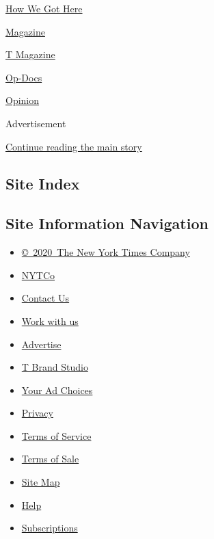 \href{/video/how-we-got-here}{How We Got Here}

\href{/video/magazine}{Magazine}

\href{/video/t-magazine}{T Magazine}

\href{/video/op-docs}{Op-Docs}

\href{/video/opinion}{Opinion}

Advertisement

\protect\hyperlink{after-bottom}{Continue reading the main story}

\hypertarget{site-index}{%
\subsection{Site Index}\label{site-index}}

\hypertarget{site-information-navigation}{%
\subsection{Site Information
Navigation}\label{site-information-navigation}}

\begin{itemize}
\tightlist
\item
  \href{https://help.nytimes3xbfgragh.onion/hc/en-us/articles/115014792127-Copyright-notice}{©~2020~The
  New York Times Company}
\end{itemize}

\begin{itemize}
\tightlist
\item
  \href{https://www.nytco.com/}{NYTCo}
\item
  \href{https://help.nytimes3xbfgragh.onion/hc/en-us/articles/115015385887-Contact-Us}{Contact
  Us}
\item
  \href{https://www.nytco.com/careers/}{Work with us}
\item
  \href{https://nytmediakit.com/}{Advertise}
\item
  \href{http://www.tbrandstudio.com/}{T Brand Studio}
\item
  \href{https://www.nytimes3xbfgragh.onion/privacy/cookie-policy\#how-do-i-manage-trackers}{Your
  Ad Choices}
\item
  \href{https://www.nytimes3xbfgragh.onion/privacy}{Privacy}
\item
  \href{https://help.nytimes3xbfgragh.onion/hc/en-us/articles/115014893428-Terms-of-service}{Terms
  of Service}
\item
  \href{https://help.nytimes3xbfgragh.onion/hc/en-us/articles/115014893968-Terms-of-sale}{Terms
  of Sale}
\item
  \href{https://spiderbites.nytimes3xbfgragh.onion}{Site Map}
\item
  \href{https://help.nytimes3xbfgragh.onion/hc/en-us}{Help}
\item
  \href{https://www.nytimes3xbfgragh.onion/subscription?campaignId=37WXW}{Subscriptions}
\end{itemize}
